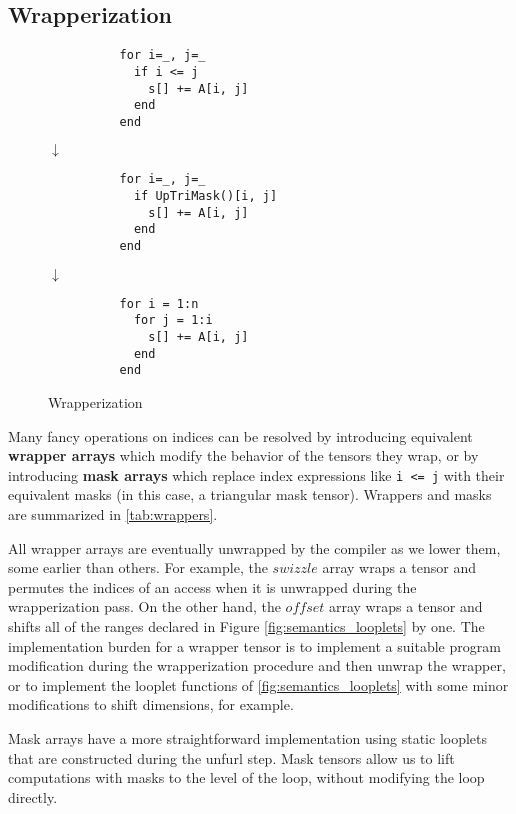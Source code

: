 \subsection{Wrapperization}
    \begin{wrapfigure}{R}{0.17\textwidth}
        \vspace{-1\intextsep}
        \begin{verbatim}
          for i=_, j=_
            if i <= j
              s[] += A[i, j]
            end
          end
        \end{verbatim}
        $\downarrow$
        \begin{verbatim}
          for i=_, j=_
            if UpTriMask()[i, j]
              s[] += A[i, j]
            end
          end
        \end{verbatim}
        $\downarrow$
        \begin{verbatim}
          for i = 1:n
            for j = 1:i
              s[] += A[i, j]
            end
          end
        \end{verbatim}
        \caption{Wrapperization}\label{fig:wrapperization}
    \end{wrapfigure}

    Many fancy operations on indices can be resolved by introducing equivalent
    \textbf{wrapper arrays} which modify the behavior of the tensors they wrap,
    or by introducing \textbf{mask arrays} which replace index expressions like
    \texttt{i <= j} with their equivalent masks (in this case, a
    triangular mask tensor).  Wrappers and masks are summarized in \ref{tab:wrappers}.

    All wrapper arrays are eventually unwrapped by the compiler as we lower
    them, some earlier than others. For example, the $swizzle$ array wraps a
    tensor and permutes the indices of an access when it is unwrapped during the
    wrapperization pass. On the other hand, the $offset$ array wraps a tensor
    and shifts all of the ranges declared in Figure \ref{fig:semantics_looplets} by one.
    The implementation burden for a wrapper tensor is to implement a suitable
    program modification during the wrapperization procedure and then unwrap the wrapper, or to 
    implement the looplet functions of \ref{fig:semantics_looplets} with some minor modifications
    to shift dimensions, for example.

    Mask arrays have a more straightforward implementation using static looplets
    that are constructed during the unfurl step. Mask tensors
    allow us to lift computations with masks to the level of the loop, without modifying the loop directly.

